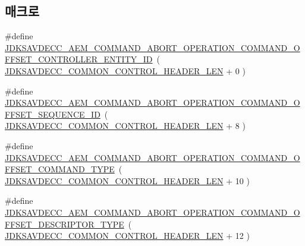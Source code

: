 \subsection*{매크로}
\begin{DoxyCompactItemize}
\item 
\#define \hyperlink{group__command__abort__operation_gad6dce81d2dcb8e0ef47feac71dab73fb}{J\+D\+K\+S\+A\+V\+D\+E\+C\+C\+\_\+\+A\+E\+M\+\_\+\+C\+O\+M\+M\+A\+N\+D\+\_\+\+A\+B\+O\+R\+T\+\_\+\+O\+P\+E\+R\+A\+T\+I\+O\+N\+\_\+\+C\+O\+M\+M\+A\+N\+D\+\_\+\+O\+F\+F\+S\+E\+T\+\_\+\+C\+O\+N\+T\+R\+O\+L\+L\+E\+R\+\_\+\+E\+N\+T\+I\+T\+Y\+\_\+\+ID}~( \hyperlink{group__jdksavdecc__avtp__common__control__header_gaae84052886fb1bb42f3bc5f85b741dff}{J\+D\+K\+S\+A\+V\+D\+E\+C\+C\+\_\+\+C\+O\+M\+M\+O\+N\+\_\+\+C\+O\+N\+T\+R\+O\+L\+\_\+\+H\+E\+A\+D\+E\+R\+\_\+\+L\+EN} + 0 )
\item 
\#define \hyperlink{group__command__abort__operation_ga6b04182ccb21333e7531865c7ae63231}{J\+D\+K\+S\+A\+V\+D\+E\+C\+C\+\_\+\+A\+E\+M\+\_\+\+C\+O\+M\+M\+A\+N\+D\+\_\+\+A\+B\+O\+R\+T\+\_\+\+O\+P\+E\+R\+A\+T\+I\+O\+N\+\_\+\+C\+O\+M\+M\+A\+N\+D\+\_\+\+O\+F\+F\+S\+E\+T\+\_\+\+S\+E\+Q\+U\+E\+N\+C\+E\+\_\+\+ID}~( \hyperlink{group__jdksavdecc__avtp__common__control__header_gaae84052886fb1bb42f3bc5f85b741dff}{J\+D\+K\+S\+A\+V\+D\+E\+C\+C\+\_\+\+C\+O\+M\+M\+O\+N\+\_\+\+C\+O\+N\+T\+R\+O\+L\+\_\+\+H\+E\+A\+D\+E\+R\+\_\+\+L\+EN} + 8 )
\item 
\#define \hyperlink{group__command__abort__operation_gacf38e1b295026a94b5710ff424d0ba36}{J\+D\+K\+S\+A\+V\+D\+E\+C\+C\+\_\+\+A\+E\+M\+\_\+\+C\+O\+M\+M\+A\+N\+D\+\_\+\+A\+B\+O\+R\+T\+\_\+\+O\+P\+E\+R\+A\+T\+I\+O\+N\+\_\+\+C\+O\+M\+M\+A\+N\+D\+\_\+\+O\+F\+F\+S\+E\+T\+\_\+\+C\+O\+M\+M\+A\+N\+D\+\_\+\+T\+Y\+PE}~( \hyperlink{group__jdksavdecc__avtp__common__control__header_gaae84052886fb1bb42f3bc5f85b741dff}{J\+D\+K\+S\+A\+V\+D\+E\+C\+C\+\_\+\+C\+O\+M\+M\+O\+N\+\_\+\+C\+O\+N\+T\+R\+O\+L\+\_\+\+H\+E\+A\+D\+E\+R\+\_\+\+L\+EN} + 10 )
\item 
\#define \hyperlink{group__command__abort__operation_gaacbbfc953508d4736f3684c42bee7b64}{J\+D\+K\+S\+A\+V\+D\+E\+C\+C\+\_\+\+A\+E\+M\+\_\+\+C\+O\+M\+M\+A\+N\+D\+\_\+\+A\+B\+O\+R\+T\+\_\+\+O\+P\+E\+R\+A\+T\+I\+O\+N\+\_\+\+C\+O\+M\+M\+A\+N\+D\+\_\+\+O\+F\+F\+S\+E\+T\+\_\+\+D\+E\+S\+C\+R\+I\+P\+T\+O\+R\+\_\+\+T\+Y\+PE}~( \hyperlink{group__jdksavdecc__avtp__common__control__header_gaae84052886fb1bb42f3bc5f85b741dff}{J\+D\+K\+S\+A\+V\+D\+E\+C\+C\+\_\+\+C\+O\+M\+M\+O\+N\+\_\+\+C\+O\+N\+T\+R\+O\+L\+\_\+\+H\+E\+A\+D\+E\+R\+\_\+\+L\+EN} + 12 )
\item 

\end{DoxyCompactItemize}
